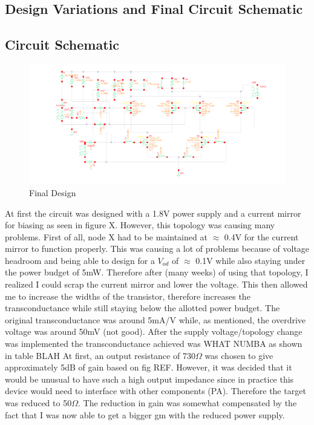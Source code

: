 \documentclass{article}                                                         %
\begin{document}
\newpage
\begin{landscape}

\section{Design Variations and Final Circuit Schematic}
\subsection{Circuit Schematic}

\begin{figure}[H]
  \centering
  \includegraphics[width=1.5\textwidth] {Figures/Circuit.png}
  \caption{Final Design}
    \label{fig:finalschem}
\end{figure}
\end{landscape}
\newpage
At first the circuit was designed with a 1.8V power supply and a current mirror for biasing
as seen in figure X. However, this topology was causing many problems. First of all, node X
had to be maintained at $\approx$ 0.4V for the current mirror to function properly. This was
causing a lot of problems because of voltage headroom and being able to design for a $V_{od}$
of $\approx$ 0.1V while also staying under the power budget of 5mW. Therefore after (many weeks)
of using that topology, I realized I could scrap the current mirror and lower the voltage.
This then allowed me to increase the widths of the transistor, therefore increases the transconductance
while still staying below the allotted power budget. The original transconductance was around 5mA/V while,
as mentioned, the overdrive voltage was around 50mV (not good). After the supply voltage/topology change
was implemented the transconductance achieved was WHAT NUMBA as shown in table BLAH
At first, an output resistance of 730$\Omega$
was chosen to give approximately 5dB of gain based on fig REF. However, it was decided that it would
be unusual to have such a high output impedance since in practice this device would need to interface
with other components (PA). Therefore the target was reduced to 50$\Omega$. The reduction in gain was
somewhat compensated by the fact that I was now able to get a bigger gm with the reduced power supply.
\end{document}
